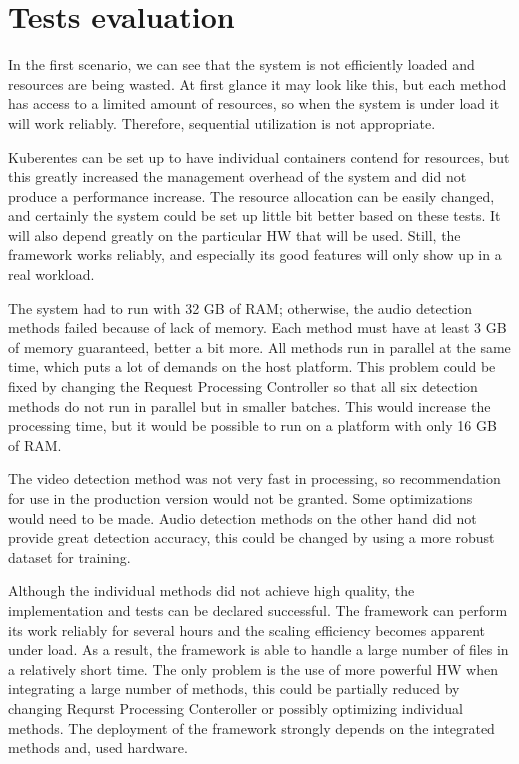 \section{Tests evaluation}

In the first scenario, we can see that the system is not efficiently loaded and resources are being wasted. At first glance it may look like this, but each method has access to a limited amount of resources, so when the system is under load it will work reliably. Therefore, sequential utilization is not appropriate.

Kuberentes can be set up to have individual containers contend for resources, but this greatly increased the management overhead of the system and did not produce a performance increase. The resource allocation can be easily changed, and certainly the system could be set up little bit better based on these tests. It will also depend greatly on the particular HW that will be used. Still, the framework works reliably, and especially its good features will only show up in a real workload.

The system had to run with 32 GB of RAM; otherwise, the audio detection methods failed because of lack of memory. Each method must have at least 3 GB of memory guaranteed, better a bit more. All methods run in parallel at the same time, which puts a lot of demands on the host platform. This problem could be fixed by changing the Request Processing Controller so that all six detection methods do not run in parallel but in smaller batches. This would increase the processing time, but it would be possible to run on a platform with only 16 GB of RAM.

The video detection method was not very fast in processing, so recommendation for use in the production version would not be granted. Some optimizations would need to be made. Audio detection methods on the other hand did not provide great detection accuracy, this could be changed by using a more robust dataset for training.

Although the individual methods did not achieve high quality, the implementation and tests can be declared successful. The framework can perform its work reliably for several hours and the scaling efficiency becomes apparent under load. As a result, the framework is able to handle a large number of files in a relatively short time. The only problem is the use of more powerful HW when integrating a large number of methods, this could be partially reduced by changing Requrst Processing Conteroller or possibly optimizing individual methods. The deployment of the framework strongly depends on the integrated methods and, used hardware. 

